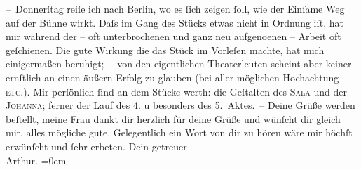 \begin{ledgroupsized}[t]{13cm}
           \pstart
           – Donnerſtag reiſe ich nach Berlin, wo es ſich
               zeigen ſoll, wie der Einſame Weg auf der Bühne
               wirkt. Daſs im Gang des Stücks etwas nicht in Ordnung iſt, hat mir während der – oft
               unterbrochenen und ganz neu aufgeno{\geminationm}enen – Arbeit oft
               geſchienen. Die gute Wirkung {\pb}die das Stück im
               Vorleſen machte, hat mich einigermaßen beruhigt; – von den eigentlichen Theaterleuten
               scheint aber keiner ernſtlich an einen äußern Erfolg zu glauben (bei aller möglichen
               Hochachtung \textsc{etc.}). Mir perſönlich ſind an dem Stücke werth:
               die Geſtalten des \textsc{Sala} und der \textsc{Johanna}; ferner der Lauf des 4. u besonders des 5. Aktes. –\pend
           \pstart
           Deine Grüße werden beſtellt, meine Frau dankt dir herzlich {\pb}für deine Grüße und
               wünſcht dir gleich mir, alles mögliche gute.\pend
           \pstart
           Gelegentlich ein Wort von dir zu hören wäre mir höchſt erwünſcht und ſehr
               erbeten.\pend
           \pstart
           Dein getreuer{\\[\baselineskip]}\spacefill\mbox{Arthur.}\pend
           \leftskip=0em{}\endnumbering{}\end{ledgroupsized}  \newcommand{\dateiname}{L01368}\newcommand{\titel}{Arthur Schnitzler an Hermann Bahr, 1. 2. 1904}\newcommand{\editorInnen}{ Kurt Ifkovits,  Martin Anton Müller}
      